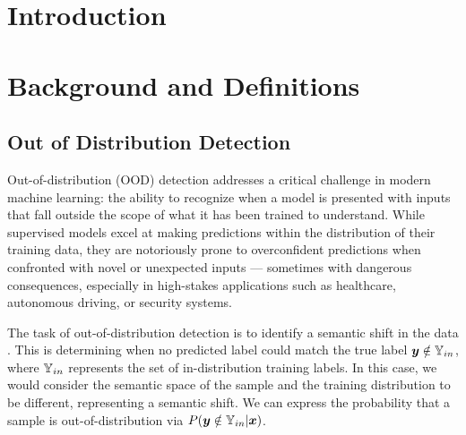 \documentclass[11pt, oneside]{book}
\theoremstyle{plain}
\theoremstyle{definition}
\theoremstyle{remark}
\begin{document}



\makedeclaration
\makeapproval
\makecopyright






\tableofcontents
\listoffigures
\listoftables

\pagebreak
{}


\chapter{Introduction}

\chapter{Background and Definitions}

\section{Out of Distribution Detection}

Out-of-distribution (OOD) detection addresses a critical challenge in modern machine learning: the ability to recognize when a model is presented with inputs that fall outside the scope of what it has been trained to understand. While supervised models excel at making predictions within the distribution of their training data, they are notoriously prone to overconfident predictions when confronted with novel or unexpected inputs — sometimes with dangerous consequences, especially in high-stakes applications such as healthcare, autonomous driving, or security systems.

The task of out-of-distribution detection is to identify a semantic shift in the data \citep{yang2021generalized}. This is determining when no predicted label could match the true label ${\bm{y}} \notin {\mathbb{Y}}_{in}$, where ${\mathbb{Y}}_{in}$ represents the set of in-distribution training labels. In this case, we would consider the semantic space of the sample and the training distribution to be different, representing a semantic shift. We can express the probability that a sample is out-of-distribution via $P({\bm{y}} \notin {\mathbb{Y}}_{in} | {\bm{x}})$. 
\end{document}
